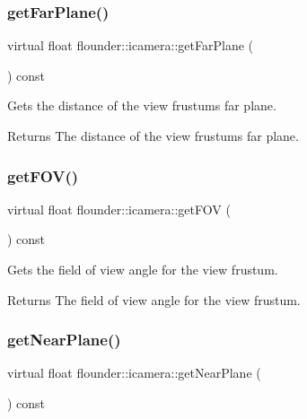 \subsubsection{\texorpdfstring{get\+Far\+Plane()}{getFarPlane()}}
{\footnotesize\ttfamily virtual float flounder\+::icamera\+::get\+Far\+Plane (\begin{DoxyParamCaption}{ }\end{DoxyParamCaption}) const\hspace{0.3cm}{\ttfamily [pure virtual]}}



Gets the distance of the view frustum\textquotesingle{}s far plane. 

\begin{DoxyReturn}{Returns}
The distance of the view frustum\textquotesingle{}s far plane. 
\end{DoxyReturn}
\mbox{\label{classflounder_1_1icamera_a1bf12448ac5ea3ed1ffa7c9a73424dde}} 
\subsubsection{\texorpdfstring{get\+F\+O\+V()}{getFOV()}}
{\footnotesize\ttfamily virtual float flounder\+::icamera\+::get\+F\+OV (\begin{DoxyParamCaption}{ }\end{DoxyParamCaption}) const\hspace{0.3cm}{\ttfamily [pure virtual]}}



Gets the field of view angle for the view frustum. 

\begin{DoxyReturn}{Returns}
The field of view angle for the view frustum. 
\end{DoxyReturn}
\mbox{\label{classflounder_1_1icamera_a1b7c9e3be4be8c5aab2a3c1b41430c47}} 
\subsubsection{\texorpdfstring{get\+Near\+Plane()}{getNearPlane()}}
{\footnotesize\ttfamily virtual float flounder\+::icamera\+::get\+Near\+Plane (\begin{DoxyParamCaption}{ }\end{DoxyParamCaption}) const\hspace{0.3cm}{\ttfamily [pure virtual]}}



